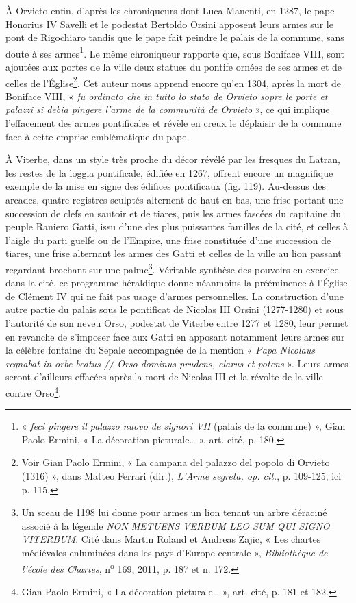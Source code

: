 \documentclass[12pt,twoside,openany]{book}
\begin{document}
À Orvieto enfin, d’après les chroniqueurs dont Luca Manenti, en 1287, le pape Honorius IV Savelli et le podestat Bertoldo Orsini apposent leurs armes sur le pont de Rigochiaro tandis que le pape fait peindre le palais de la commune, sans doute à ses armes\footnote{« \textit{feci pingere il palazzo nuovo de signori VII} (palais de la commune) », Gian Paolo Ermini, « La décoration picturale… », art. cité, p. 180.}. Le même chroniqueur rapporte que, sous Boniface VIII, sont ajoutées aux portes de la ville deux statues du pontife ornées de ses armes et de celles de l’Église\footnote{Voir Gian Paolo Ermini, « La campana del palazzo del popolo di Orvieto (1316) », dans Matteo Ferrari (dir.), \textit{L’Arme segreta, op. cit.}, p. 109-125, ici p. 115.}. Cet auteur nous apprend encore qu’en 1304, après la mort de Boniface VIII, « \textit{fu ordinato che in tutto lo stato de Orvieto sopre le porte et palazzi si debia pingere l’arme de la communità de Orvieto} », ce qui implique l’effacement des armes pontificales et révèle en creux le déplaisir de la commune face à cette emprise emblématique du pape.

À Viterbe, dans un style très proche du décor révélé par les fresques du Latran, les restes de la loggia pontificale, édifiée en 1267, offrent encore un magnifique exemple de la mise en signe des édifices pontificaux (fig. 119). Au-dessus des arcades, quatre registres sculptés alternent de haut en bas, une frise portant une succession de clefs en sautoir et de tiares, puis les armes fascées du capitaine du peuple Raniero Gatti, issu d’une des plus puissantes familles de la cité, et celles à l’aigle du parti guelfe ou de l’Empire, une frise constituée d’une succession de tiares, une frise alternant les armes des Gatti et celles de la ville au lion passant regardant brochant sur une palme\footnote{Un sceau de 1198 lui donne pour armes un lion tenant un arbre déraciné associé à la légende \textit{NON METUENS VERBUM LEO SUM QUI SIGNO VITERBUM}\textsc{. }Cité dans Martin Roland et Andreas Zajic, « Les chartes médiévales enluminées dans les pays d’Europe centrale », \textit{Bibliothèque de l’école des Chartes}, n\textsuperscript{o} 169, 2011, p. 187 et n. 172.}. Véritable synthèse des pouvoirs en exercice dans la cité, ce programme héraldique donne néanmoins la prééminence à l’Église de Clément IV qui ne fait pas usage d’armes personnelles. La construction d’une autre partie du palais sous le pontificat de Nicolas III Orsini (1277-1280) et sous l’autorité de son neveu Orso, podestat de Viterbe entre 1277 et 1280, leur permet en revanche de s’imposer face aux Gatti en apposant notamment leurs armes sur la célèbre fontaine du Sepale accompagnée de la mention « \textit{Papa Nicolaus regnabat in orbe beatus // Orso dominus prudens, clarus et potens} ». Leurs armes seront d’ailleurs effacées après la mort de Nicolas III et la révolte de la ville contre Orso\footnote{Gian Paolo Ermini, « La décoration picturale… », art. cité, p. 181 et 182.}.
\end{document}
